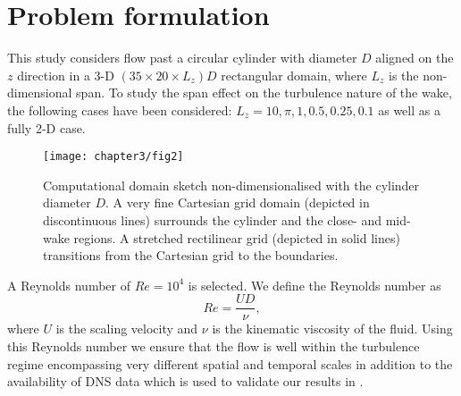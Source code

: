\documentclass[../main.tex]{subfiles}
\begin{document}
\section{Problem formulation}\label{sec:circular_cylinder_details}

This study considers flow past a circular cylinder with diameter $D$ aligned on the $z$ direction in a 3-D $\left(35\times20\times L_z\right)D$ rectangular domain, where $L_z$ is the non-dimensional span.
To study the span effect on the turbulence nature of the wake, the following cases have been considered: $L_z=10, \pi, 1, 0.5, 0.25, 0.1$ as well as a fully 2-D case.

\begin{figure}
	\vspace*{0.2cm}
  \centerline{\texttt{[image: chapter3/fig2]}}
  \caption{Computational domain sketch non-dimensionalised with the cylinder diameter $D$.
  A very fine Cartesian grid domain (depicted in discontinuous lines) surrounds the cylinder and the close- and mid-wake regions.
  A stretched rectilinear grid (depicted in solid lines) transitions from the Cartesian grid to the boundaries.}
\label{fig:computational_domain}
\end{figure}

A Reynolds number of $Re=10^4$ is selected.
We define the Reynolds number as
\begin{equation}
Re=\frac{UD}{\nu},
\end{equation}
where $U$ is the scaling velocity and $\nu$ is the kinematic viscosity of the fluid.
Using this Reynolds number we ensure that the flow is well within the turbulence regime encompassing very different spatial and temporal scales in addition to the availability of DNS data \citep{Dong2005} which is used to validate our results in .
\end{document}
